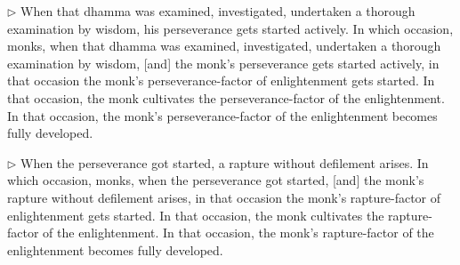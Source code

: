 
\addtocounter{sennum}{-2}
$\triangleright$  When that dhamma was examined, investigated, undertaken a thorough examination by wisdom, his perseverance gets started actively.  In which occasion, monks, when that dhamma was examined, investigated, undertaken a thorough examination by wisdom, [and] the monk's perseverance gets started actively, in that occasion the monk's perseverance-factor of enlightenment gets started. In that occasion, the monk cultivates the perseverance-factor of the enlightenment. In that occasion, the monk's perseverance-factor of the enlightenment becomes fully developed.\\


\addtocounter{sennum}{-2}
$\triangleright$  When the perseverance got started, a rapture without defilement arises.  In which occasion, monks, when the perseverance got started, [and] the monk's rapture without defilement arises, in that occasion the monk's rapture-factor of enlightenment gets started. In that occasion, the monk cultivates the rapture-factor of the enlightenment. In that occasion, the monk's rapture-factor of the enlightenment becomes fully developed.\\

